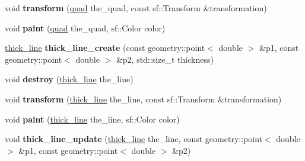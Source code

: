 \begin{DoxyCompactItemize}
\item 
\hypertarget{classophidian_1_1gui_1_1canvas_a4f2efc355c3944ba4ad41aad67506103}{void {\bfseries transform} (\hyperlink{structophidian_1_1gui_1_1quad}{quad} the\-\_\-quad, const sf\-::\-Transform \&transformation)}\label{classophidian_1_1gui_1_1canvas_a4f2efc355c3944ba4ad41aad67506103}

\item 
\hypertarget{classophidian_1_1gui_1_1canvas_ab7ca3cb2e952c866a3ca227abb3ef74c}{void {\bfseries paint} (\hyperlink{structophidian_1_1gui_1_1quad}{quad} the\-\_\-quad, sf\-::\-Color color)}\label{classophidian_1_1gui_1_1canvas_ab7ca3cb2e952c866a3ca227abb3ef74c}

\item 
\hypertarget{classophidian_1_1gui_1_1canvas_a996767833580a79acaf40f2c3318086e}{\hyperlink{structophidian_1_1gui_1_1thick__line}{thick\-\_\-line} {\bfseries thick\-\_\-line\-\_\-create} (const geometry\-::point$<$ double $>$ \&p1, const geometry\-::point$<$ double $>$ \&p2, std\-::size\-\_\-t thickness)}\label{classophidian_1_1gui_1_1canvas_a996767833580a79acaf40f2c3318086e}

\item 
\hypertarget{classophidian_1_1gui_1_1canvas_aa9eb15450e9ab75b344eef3786c52f9c}{void {\bfseries destroy} (\hyperlink{structophidian_1_1gui_1_1thick__line}{thick\-\_\-line} the\-\_\-line)}\label{classophidian_1_1gui_1_1canvas_aa9eb15450e9ab75b344eef3786c52f9c}

\item 
\hypertarget{classophidian_1_1gui_1_1canvas_aa554ef1a86f92a4f4f98b5a2ae71d429}{void {\bfseries transform} (\hyperlink{structophidian_1_1gui_1_1thick__line}{thick\-\_\-line} the\-\_\-line, const sf\-::\-Transform \&transformation)}\label{classophidian_1_1gui_1_1canvas_aa554ef1a86f92a4f4f98b5a2ae71d429}

\item 
\hypertarget{classophidian_1_1gui_1_1canvas_aa2c7f99e8fb172a1744095ccc53ad90f}{void {\bfseries paint} (\hyperlink{structophidian_1_1gui_1_1thick__line}{thick\-\_\-line} the\-\_\-line, sf\-::\-Color color)}\label{classophidian_1_1gui_1_1canvas_aa2c7f99e8fb172a1744095ccc53ad90f}

\item 
\hypertarget{classophidian_1_1gui_1_1canvas_ad632c763633610c4b21972b1937a3e88}{void {\bfseries thick\-\_\-line\-\_\-update} (\hyperlink{structophidian_1_1gui_1_1thick__line}{thick\-\_\-line} the\-\_\-line, const geometry\-::point$<$ double $>$ \&p1, const geometry\-::point$<$ double $>$ \&p2)}\label{classophidian_1_1gui_1_1canvas_ad632c763633610c4b21972b1937a3e88}


\end{DoxyCompactItemize}
